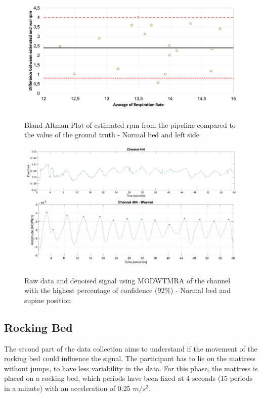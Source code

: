 \begin{figure}[p]
  \centering
  \includegraphics[width=\textwidth]{img/balnd4.png}

  \caption{Bland Altman Plot of estimated rpm from the pipeline compared to the value of the ground truth - Normal bed and left side}
  \label{fig:baln4}
  \vspace{1.5cm}
  \includegraphics[width=\textwidth]{img/404.jpg}
  \includegraphics[width=\textwidth]{img/404_wave.jpg}
\caption{Raw data and denoised signal using MODWTMRA of the channel with the highest percentage of confidence (92\%) - Normal bed and supine position}
  \label{fig:rec4}
\end{figure}

\clearpage
\subsection{Rocking Bed}\label{cap:RockSavitx}
The second part of the data collection aims to understand if the movement of the
rocking bed could influence the signal. The participant has to lie on the mattress without jumps, to have less variability in the data. For this phase, the mattress is placed on a rocking bed, which periods have been fixed at 4 seconds (15 periods in a minute) with an acceleration of 0.25 $m/s^2$.


